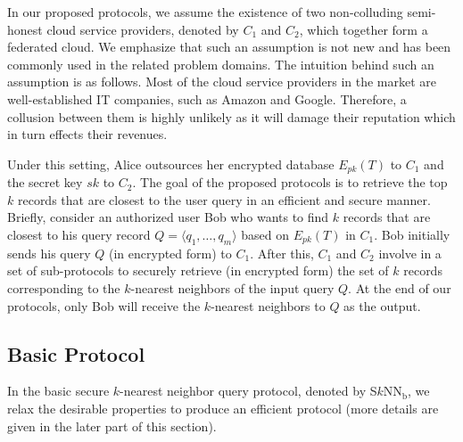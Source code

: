 \documentclass{article}
\begin{document}
In our proposed protocols, we assume the existence of two non-colluding semi-honest 
cloud service providers, denoted by $C_1$ and $C_2$, which together form 
a federated cloud. We emphasize that such an assumption is not new and has been 
commonly used in the related problem domains\cite{twinclouds-2011,wang-fuzzy-2013}. The intuition behind 
such an assumption is as follows. Most of the cloud service providers in the market are well-established 
IT companies, such as Amazon and Google. Therefore,  a collusion 
between them is highly unlikely as it will damage their reputation which 
in turn effects their revenues. 

Under this setting, Alice outsources her encrypted database $E_{pk}(T)$ 
to $C_1$ and the secret key $sk$ to $C_2$. 
The goal of the proposed protocols is to retrieve the top 
$k$ records that are closest to the user query  
in an efficient and secure manner. Briefly, consider an authorized user Bob who wants 
to find $k$ records that are closest to his query 
record $Q = \langle q_1, \ldots, q_m\rangle $ based on $E_{pk}(T)$ in $C_1$. 
Bob initially sends his query $Q$ (in encrypted form) to $C_1$. After
this, $C_1$ and $C_2$ involve in a set of sub-protocols to securely retrieve 
(in encrypted form) the set of $k$ records corresponding 
to the $k$-nearest neighbors of the input query $Q$. At the end of 
our protocols, only Bob will receive the $k$-nearest neighbors to $Q$ as the output. 

\subsection{Basic Protocol}\label{sec:basic-method}

In the basic secure $k$-nearest neighbor query protocol, denoted by S$k$NN$_\textrm{b}$, 
we relax the desirable properties 
to produce an efficient protocol (more details are given in the later part of this section). 
\end{document}
